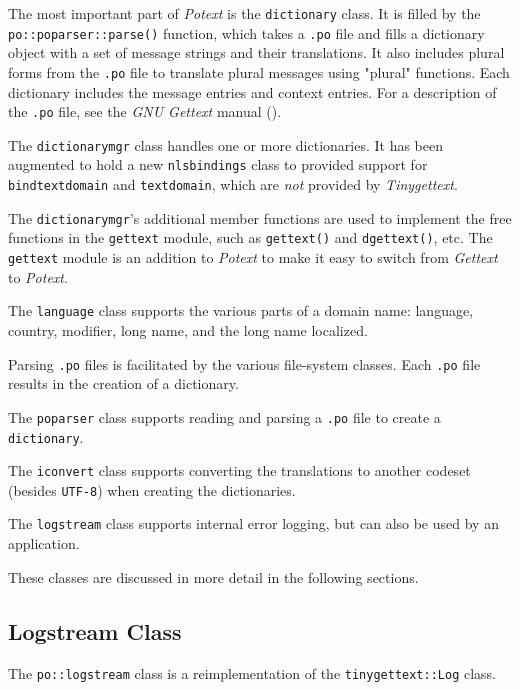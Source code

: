    The most important part of \textsl{Potext} is the
   \texttt{dictionary} class.
   It is filled by the \texttt{po::poparser::parse()} function,
   which takes a \texttt{.po} file and fills a dictionary object
   with a set of message strings and their translations.
   It also includes plural forms from the \texttt{.po} file to
   translate plural messages using "plural" functions.
   Each dictionary includes the message entries and context entries.
   For a description of the \texttt{.po} file, see
   the \textsl{GNU Gettext} manual (\cite{gettextman}).

   The \texttt{dictionarymgr} class handles one or more dictionaries.
   It has been augmented to hold a new \texttt{nlsbindings} class to
   provided support for \texttt{bindtextdomain} and \texttt{textdomain},
   which are \textsl{not} provided by \textsl{Tinygettext}.

   The \texttt{dictionarymgr}'s additional member functions are used
   to implement the free functions in the \texttt{gettext} module, such
   as \texttt{gettext()} and \texttt{dgettext()},
   etc.
   The \texttt{gettext} module is an addition to \textsl{Potext} to
   make it easy to switch from \textsl{Gettext} to \textsl{Potext}.

   The \texttt{language} class supports the various parts of
   a domain name: language, country, modifier, long name, and the
   long name localized.

   Parsing \texttt{.po} files is facilitated by the various file-system
   classes. Each \texttt{.po} file results in the creation of a dictionary.

   The \texttt{poparser} class supports reading and parsing a
   \texttt{.po} file to create a \texttt{dictionary}.

   The \texttt{iconvert} class supports converting the translations
   to another codeset (besides \texttt{UTF-8}) when creating the
   dictionaries.

   The \texttt{logstream} class supports internal error logging,
   but can also be used by an application.

   These classes are discussed in more detail in the following sections.

\subsection{Logstream Class}
\label{subsec:potext_logstream_class}

   The \texttt{po::logstream} class is a reimplementation of the
   \texttt{tinygettext::Log} class.

